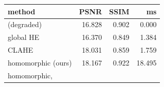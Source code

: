 \begin{tabular}{lrrr}
\toprule
method & PSNR & SSIM & ms \\
\midrule
(degraded) & 16.828 & 0.902 & 0.000 \\
global HE & 16.370 & 0.849 & 1.384 \\
CLAHE & 18.031 & 0.859 & 1.759 \\
homomorphic (ours) & 18.167 & 0.922 & 18.495 \\
homomorphic, %
\bottomrule
\end{tabular}

